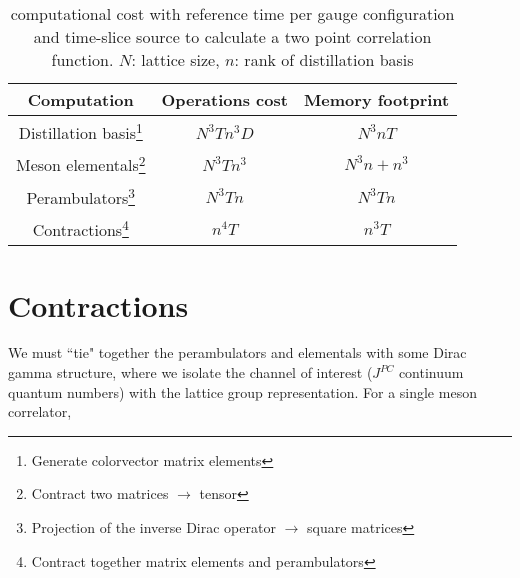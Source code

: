         \begin{table}
        \begin{minipage}{16cm}
        \hspace*{2em}\begin{tabular}{ccc}
        Computation    & Operations cost & Memory footprint \\ \hline
        Distillation basis\footnote{Generate colorvector matrix elements}& $N^3Tn^3D$         & $N^3nT$      \\
        Meson elementals\footnote{Contract two matrices $\to$ tensor} & $N^3Tn^3$      & $N^3n + n^3$  \\
        Perambulators\footnote{Projection of the inverse Dirac operator $\to$ square matrices} & $N^3Tn$   & $N^3Tn$            \\
        Contractions\footnote{Contract together matrix elements and perambulators}   & $n^4T$    & $n^{3}T$   
        \end{tabular}
        \end{minipage}
        \caption{computational cost with reference time per gauge configuration and time-slice source to calculate a two point correlation function. $N$: lattice size, $n$: rank of distillation basis}
      \end{table}

  \section{Contractions}
  We must ``tie" together the perambulators and elementals with some Dirac gamma structure, where we isolate the channel of interest ($J^{PC}$ continuum quantum numbers) with the lattice group representation. For a single meson correlator, \\ 

